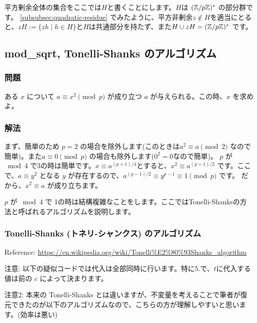 \documentclass{jsarticle}
\begin{document}
   平方剰余全体の集合をここでは$H$と書くことにします。$H$は $(\mathbb{Z}/p\mathbb{Z})^*$ の部分群です。
   \ref{subsubsec:quadratic-residue} でみたように、平方非剰余$z \not \in H$を適当にとると、$zH := \{zh \mid h \in H\}$と$H$は共通部分を持たず、また$H \cup zH = (\mathbb{Z}/p\mathbb{Z})^*$ です。
\subsection{mod\_sqrt, Tonelli-Shanks のアルゴリズム}
\subsubsection{問題}
ある $x$ について $a \equiv x^2 \pmod p$ が成り立つ $a$ が与えられる。この時、$x$ を求めよ。

\subsubsection{解法}
まず、簡単のため $p = 2$ の場合を除外します(このときは$a^2 \equiv a \pmod 2$ なので簡単)。また$a \equiv 0 \pmod p$ の場合も除外します($0^2 = 0$なので簡単)。
$p$ が${}\bmod 4$ で3の時は簡単です。$x \equiv a^{(p+1)/4}$とすると、$x^2 \equiv a^{(p+1)/2}$ です。ここで、$a \equiv y^2$ となる $y$ が存在するので、$a^{(p-1)/2}\equiv y^{p-1}\equiv 1 \pmod p$ です。
だから、$x^2 \equiv a$ が成り立ちます。

$p$ が ${}\bmod 4$ で 1の時は結構複雑なことをします。ここではTonelli-Shanksの方法と呼ばれるアルゴリズムを説明します。

\subsubsection{Tonelli-Shanks (トネリ-シャンクス) のアルゴリズム}
Reference: \url{https://en.wikipedia.org/wiki/Tonelli%E2%80%93Shanks_algorithm}

注意: 以下の疑似コードでは代入は全部同時に行います。特に5.で、$t$に代入する値は前の $c$ によって決まります。

注意2: 本来の Tonelli-Shanks とは違いますが、不変量を考えることで筆者が復元できたのが以下のアルゴリズムなので、こちらの方が理解しやすいと思います。(効率は悪い)
\end{document}
